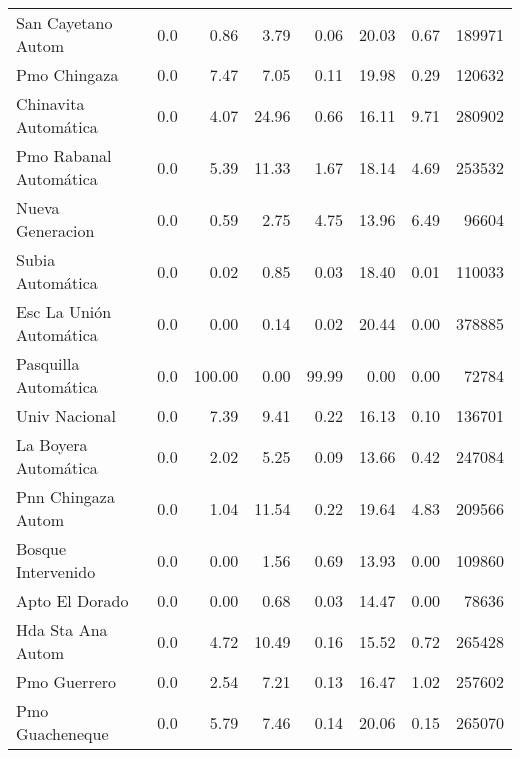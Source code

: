 \begin{enumerate}
\begin{landscape}
\begin{longtable}{p{5cm}rrrrrrr}
      San Cayetano Autom &        0.0 &      0.86 &           3.79 &     0.06 &      20.03 &          0.67 &       189971 \\
            Pmo Chingaza &        0.0 &      7.47 &           7.05 &     0.11 &      19.98 &          0.29 &       120632 \\
    Chinavita Automática &        0.0 &      4.07 &          24.96 &     0.66 &      16.11 &          9.71 &       280902 \\
  Pmo Rabanal Automática &        0.0 &      5.39 &          11.33 &     1.67 &      18.14 &          4.69 &       253532 \\
        Nueva Generacion &        0.0 &      0.59 &           2.75 &     4.75 &      13.96 &          6.49 &        96604 \\
        Subia Automática &        0.0 &      0.02 &           0.85 &     0.03 &      18.40 &          0.01 &       110033 \\
 Esc La Unión Automática &        0.0 &      0.00 &           0.14 &     0.02 &      20.44 &          0.00 &       378885 \\
    Pasquilla Automática &        0.0 &    100.00 &           0.00 &    99.99 &       0.00 &          0.00 &        72784 \\
           Univ Nacional &        0.0 &      7.39 &           9.41 &     0.22 &      16.13 &          0.10 &       136701 \\
    La Boyera Automática &        0.0 &      2.02 &           5.25 &     0.09 &      13.66 &          0.42 &       247084 \\
      Pnn Chingaza Autom &        0.0 &      1.04 &          11.54 &     0.22 &      19.64 &          4.83 &       209566 \\
      Bosque Intervenido &        0.0 &      0.00 &           1.56 &     0.69 &      13.93 &          0.00 &       109860 \\
          Apto El Dorado &        0.0 &      0.00 &           0.68 &     0.03 &      14.47 &          0.00 &        78636 \\
       Hda Sta Ana Autom &        0.0 &      4.72 &          10.49 &     0.16 &      15.52 &          0.72 &       265428 \\
            Pmo Guerrero &        0.0 &      2.54 &           7.21 &     0.13 &      16.47 &          1.02 &       257602 \\
         Pmo Guacheneque &        0.0 &      5.79 &           7.46 &     0.14 &      20.06 &          0.15 &       265070 \\

\end{longtable}
\end{landscape}
\end{enumerate}
